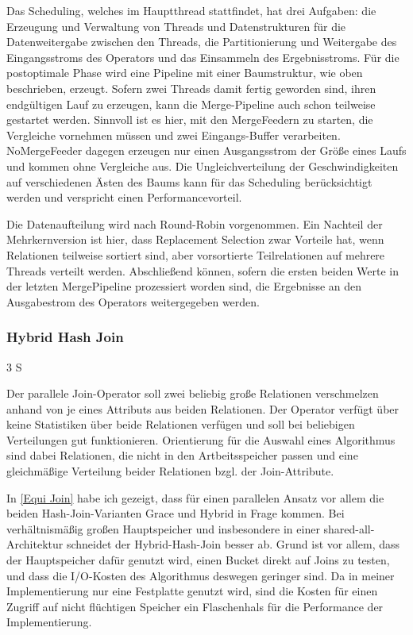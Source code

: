 \documentclass[a4paper,12pt,twoside]{article}
\begin{document}
Das Scheduling, welches im Hauptthread stattfindet, hat drei Aufgaben: die Erzeugung und Verwaltung von Threads und Datenstrukturen für die Datenweitergabe zwischen den Threads, die Partitionierung und Weitergabe des Eingangsstroms des Operators und das Einsammeln des Ergebnisstroms. Für die postoptimale Phase wird eine Pipeline mit einer Baumstruktur, wie oben beschrieben, erzeugt. Sofern zwei Threads damit fertig geworden sind, ihren endgültigen Lauf zu erzeugen, kann die Merge-Pipeline auch schon teilweise gestartet werden. Sinnvoll ist es hier, mit den MergeFeedern zu starten, die Vergleiche vornehmen müssen und zwei Eingangs-Buffer verarbeiten. NoMergeFeeder dagegen erzeugen nur einen Ausgangsstrom der Größe eines Laufs und kommen ohne Vergleiche aus. Die Ungleichverteilung der Geschwindigkeiten auf verschiedenen Ästen des Baums kann für das Scheduling berücksichtigt werden und verspricht einen Performancevorteil.

Die Datenaufteilung wird nach Round-Robin vorgenommen. Ein Nachteil der Mehrkernversion ist hier, dass Replacement Selection zwar Vorteile hat, wenn Relationen teilweise sortiert sind, aber vorsortierte Teilrelationen auf mehrere Threads verteilt werden. Abschließend können, sofern die ersten beiden Werte in der letzten MergePipeline prozessiert worden sind, die Ergebnisse an den Ausgabestrom des Operators weitergegeben werden.

\subsubsection{Hybrid Hash Join} 3 S
\label{entw:hash}

Der parallele Join-Operator soll zwei beliebig große Relationen verschmelzen anhand von je eines Attributs aus beiden Relationen. Der Operator verfügt über keine Statistiken über beide Relationen verfügen und soll bei beliebigen Verteilungen gut funktionieren. Orientierung für die Auswahl eines Algorithmus sind dabei Relationen, die nicht in den Artbeitsspeicher passen und eine gleichmäßige Verteilung beider Relationen bzgl. der Join-Attribute.

In \autoref{Equi Join} habe ich gezeigt, dass für einen parallelen Ansatz vor allem die beiden Hash-Join-Varianten Grace und Hybrid in Frage kommen. Bei verhältnismäßig großen Hauptspeicher und insbesondere in einer shared-all-Architektur schneidet der Hybrid-Hash-Join besser ab. Grund ist vor allem, dass der Hauptspeicher dafür genutzt wird, einen Bucket direkt auf Joins zu testen, und dass die I/O-Kosten des Algorithmus deswegen geringer sind. Da in meiner Implementierung nur eine Festplatte genutzt wird, sind die Kosten für einen Zugriff auf nicht flüchtigen Speicher ein Flaschenhals für die Performance der Implementierung.
\end{document}
